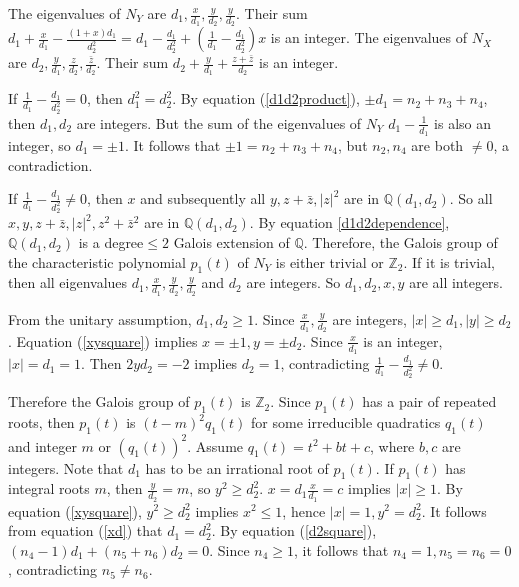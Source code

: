 \documentclass[12pt,psamsfonts]{amsart}
\newcommand{\Q}{\mathbb Q}
\newcommand{\Z}{\mathbb Z}
\numberwithin{equation}{section}
\theoremstyle{definition}
\begin{document}
The eigenvalues of $N_Y$ are $d_1,
\frac{x}{d_1},\frac{y}{d_2},\frac{y}{d_2}$.  Their sum
$d_1+\frac{x}{d_1}-\frac{(1+x)d_1}{d_2^2}=d_1-\frac{d_1}{d_2^2}+(\frac{1}{d_1}-\frac{d_1}{d_2^2})x$
is an integer. The eigenvalues of $N_X$ are $d_2,
\frac{y}{d_1},\frac{z}{d_2},\frac{\bar{z}}{d_2}$.  Their sum
$d_2+\frac{y}{d_1}+\frac{z+\bar{z}}{d_2}$ is an integer.

If $\frac{1}{d_1}-\frac{d_1}{d_2^2}= 0$, then $d_1^2=d_2^2$. By
equation (\ref{d1d2product}), $\pm d_1=n_2+n_3+n_4$, then $d_1,d_2$
are integers. But the sum of the eigenvalues of $N_Y$
$d_1-\frac{1}{d_1}$ is also an integer, so $d_1=\pm 1$. It follows
that $\pm 1=n_2+n_3+n_4$, but $n_2,n_4$ are both $\neq 0$, a
contradiction.

If $\frac{1}{d_1}-\frac{d_1}{d_2^2}\neq 0$, then $x$ and
subsequently all $y,z+\bar{z},|z|^2$ are in $\Q(d_1,d_2)$.
So all $x,y,z+\bar{z},|z|^2,z^2+\bar{z}^2$ are in $\Q(d_1,d_2)$.
By equation \ref{d1d2dependence}, $\Q(d_1,d_2)$ is a degree$\leq 2$ Galois extension of $\Q$.
Therefore, the Galois group of the characteristic polynomial
$p_1(t)$ of $N_Y$ is either trivial or $\Z_2$.  If it is trivial,
then all eigenvalues $d_1,
\frac{x}{d_1},\frac{y}{d_2},\frac{y}{d_2}$ and $d_2$ are integers.
So $d_1,d_2,x,y$ are all integers.

From the unitary assumption, $d_1, d_2\geq 1$.  Since $\frac{x}{d_1},
\frac{y}{d_2}$ are integers, $|x|\geq d_1,|y|\geq d_2$.  Equation (\ref{xysquare})
implies $x=\pm 1, y=\pm d_2$.  Since $\frac{x}{d_1}$ is an integer, $|x|=d_1=1$.  Then
$2yd_2=-2$ implies $d_2=1$,
contradicting $\frac{1}{d_1}-\frac{d_1}{d_2^2}\neq 0$.

Therefore the Galois group of $p_1(t)$ is $\Z_2$.  Since $p_1(t)$
has a pair of repeated roots, then $p_1(t)$ is $(t-m)^2 q_1(t)$
for some irreducible quadratics $q_1(t)$ and integer $m$ or
$(q_1(t))^2$.  Assume $q_1(t)=t^2+bt+c$, where $b,c$ are integers.
 Note that $d_1$ has to be an irrational root of $p_1(t)$.
If $p_1(t)$ has integral roots $m$, then $\frac{y}{d_2}=m$, so
$y^2\geq d_2^2$.  $x=d_1\frac{x}{d_1}=c$ implies $|x|\geq 1$.  By equation (\ref{xysquare}), $y^2\geq d_2^2$ implies
$x^2\leq 1$, hence
$|x|=1,y^2=d_2^2$.  It follows from equation (\ref{xd}) that $d_1=d_2^2$.
By equation (\ref{d2square}), $(n_4-1)d_1+(n_5+n_6)d_2=0$.  Since $n_4\geq 1$, it follows that
$n_4=1,n_5=n_6=0$, contradicting $n_5\neq n_6$.
\end{document}
